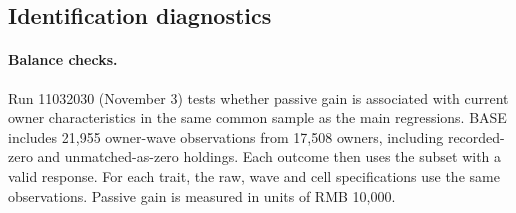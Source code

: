 \documentclass[11pt,letterpaper,english,final]{article}
\begin{document}
\subsection{Identification diagnostics}

\paragraph{Balance checks.}
Run 11032030 (November 3) tests whether passive gain is associated with current owner characteristics in the same common sample as the main regressions. BASE includes 21,955 owner-wave observations from 17,508 owners, including recorded-zero and unmatched-as-zero holdings. Each outcome then uses the subset with a valid response. For each trait, the raw, wave and cell specifications use the same observations. Passive gain is measured in units of RMB 10,000.
\end{document}

